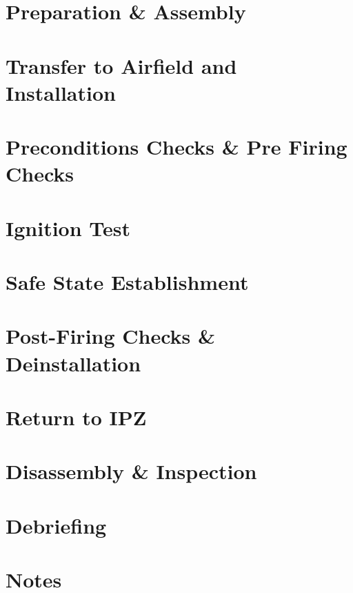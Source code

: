 \documentclass{article}
\begin{document}
\section{Preparation \& Assembly}

\newpage
\section{Transfer to Airfield and Installation}


\section{Preconditions Checks \& Pre Firing Checks}


\section{Ignition Test}


%

\section{Safe State Establishment}


\section{Post-Firing Checks \& Deinstallation}


\section{Return to IPZ}


\section{Disassembly \& Inspection}


\section{Debriefing}

\newpage

\setcounter{section}{0}
\section*{Notes}

\end{document}

